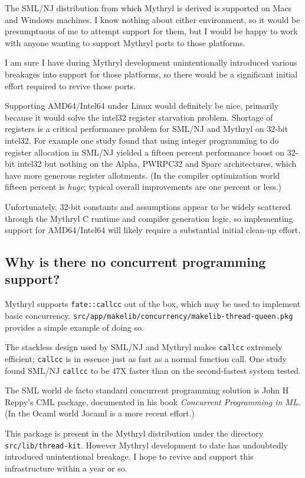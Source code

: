 The SML/NJ distribution from which Mythryl is derived is supported on 
Macs and Windows machines.  I know nothing about either environment, 
so it would be presumptuous of me to attempt support for them, but I 
would be happy to work with anyone wanting to support Mythryl ports 
to those platforms.

I am sure I have during Mythryl development unintentionally introduced 
various breakages into support for those platforms, so there would be 
a significant initial effort required to revive those ports.

Supporting AMD64/Intel64 under Linux would definitely be nice, 
primarily because it would solve the intel32 register starvation problem. 
Shortage of registers is a critical performance problem for SML/NJ and 
Mythryl on 32-bit intel32.  For example one study found that using integer 
programming to do register allocation in SML/NJ yielded a fifteen 
percent performance boost on 32-bit intel32 but nothing on the Alpha, PWRPC32 
and Sparc architectures, which have more generous register allotments. 
(In the compiler optimization world fifteen percent is {\it huge}; 
typical overall improvements are one percent or less.)

Unfortunately, 32-bit constants and assumptions appear to be widely 
scattered through the Mythryl C runtime and compiler generation logic, 
so implementing support for AMD64/Intel64 will likely require a 
substantial initial clean-up effort.


\subsection{Why is there no concurrent programming support?}

Mythryl supports {\tt fate::callcc} out of the box, which may be used 
to implement basic concurrency.  {\tt src/app/makelib/concurrency/makelib-thread-queen.pkg} 
provides a simple example of doing so.

The stackless design used by SML/NJ and Mythryl makes {\tt callcc} 
extremely efficient; {\tt callcc} is in essence just as fast as a 
normal function call.  One study found SML/NJ {\tt callcc} to be 47X 
faster than on the second-fastest system tested.

The SML world de facto standard concurrent programming solution is John 
H Reppy's CML package, documented in his book {\it Concurrent Programming 
in ML.}  (In the Ocaml world Jocaml is a more recent effort.)

This package is present in the Mythryl distribution under the directory 
{\tt src/lib/thread-kit}.  However Mythryl development to date has 
undoubtedly introduced unintentional breakage.  I hope to revive and 
support this infrastructure within a year or so.

